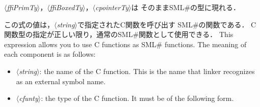 \documentclass{jbook}
\newcommand{\smlsharp}{SML\#}
\newcommand{\nonterm}[1]{\mbox{$\langle$}{\it #1}\mbox{$\rangle$}}
\begin{document}
\nonterm{ffiPrimTy}，\nonterm{ffiBoxedTy}，\nonterm{cpointerTy}は
そのまま\smlsharp{}の型に現れる．

	この式の値は，\nonterm{string}で指定されたC関数を呼び出す
\smlsharp{}の関数である．
	C関数型の指定が正しい限り，通常の\smlsharp{}関数として使用できる．
\else%
	This expression allows you to use C functions as
\smlsharp{} functions.
	The meaning of each component is as follows:
\begin{itemize}
\item \nonterm{string}: the name of the C function.
	This is the name that linker recognizes as an external symbol
name.
\item \nonterm{cfunty}: the type of the C function.
	It must be of the following form.
\end{itemize}	
\end{document}
